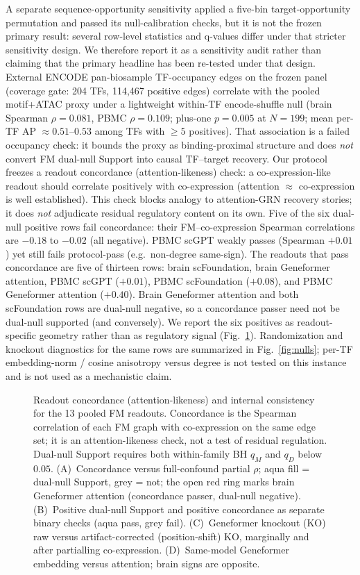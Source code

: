 \documentclass[fleqn,10pt,lineno]{wlpeerj}
\newcommand{\fitfig}[1]{\resizebox{\ifdim\width>\linewidth\linewidth\else\width\fi}{!}{#1}}
\begin{document}
A separate sequence-opportunity sensitivity applied a five-bin target-opportunity permutation and
passed its null-calibration checks, but it is not the frozen primary result: several row-level
statistics and q-values differ under that stricter sensitivity design. We therefore report it as a
sensitivity audit rather than claiming that the primary headline has been re-tested under that
design.
External ENCODE pan-biosample TF-occupancy edges on the frozen panel (coverage gate:
204 TFs, 114{,}467 positive edges) correlate with the pooled motif+ATAC proxy under a lightweight
within-TF encode-shuffle null (brain Spearman $\rho=0.081$, PBMC $\rho=0.109$; plus-one
$p=0.005$ at $N=199$; mean per-TF AP $\approx0.51$--$0.53$ among TFs with $\ge5$ positives).
That association is a failed occupancy check: it bounds the proxy as
binding-proximal structure and does \emph{not} convert FM dual-null Support into causal TF--target
recovery.
 Our protocol freezes a readout
concordance (attention-likeness) check: a co-expression-like readout should correlate
positively with co-expression (attention $\approx$ co-expression is well established). This check
blocks analogy to attention-GRN recovery stories; it does \emph{not} adjudicate residual regulatory
content on its own. Five of the six dual-null positive rows fail concordance: their FM--co-expression
Spearman correlations are $-0.18$ to $-0.02$ (all negative). PBMC scGPT weakly passes
(Spearman $+0.01$) yet still fails protocol-pass (e.g.\ non-degree same-sign). The readouts that
pass concordance are five of thirteen rows: brain scFoundation, brain Geneformer attention,
PBMC scGPT ($+0.01$), PBMC scFoundation ($+0.08$), and PBMC Geneformer attention ($+0.40$).
Brain Geneformer attention and both scFoundation rows are dual-null negative, so a concordance
passer need not be dual-null supported (and conversely).
We report the six positives as readout-specific geometry rather than as regulatory signal
(Fig.~\ref{fig:concordance}). Randomization and knockout diagnostics for the same rows are
summarized in Fig.~\ref{fig:nulls}; per-TF embedding-norm / cosine anisotropy versus degree is
not tested on this instance and is not used as a mechanistic claim.

\begin{figure}[!tbp]\centering
\fitfig{}
\caption{Readout concordance (attention-likeness) and internal consistency for the 13 pooled FM
readouts. Concordance is the Spearman correlation of each FM graph with co-expression on the same
edge set; it is an attention-likeness check, not a test of residual regulation. Dual-null Support
requires both within-family BH $q_M$ and $q_D$ below $0.05$. (A)~Concordance versus full-confound
partial $\rho$; aqua fill = dual-null Support, grey = not; the open red ring marks brain Geneformer
attention (concordance passer, dual-null negative). (B)~Positive dual-null Support and positive
concordance as separate binary checks (aqua pass, grey fail). (C)~Geneformer knockout (KO) raw
versus artifact-corrected (position-shift) KO, marginally and after partialling co-expression.
(D)~Same-model Geneformer embedding versus attention; brain signs are opposite.}
\label{fig:concordance}
\end{figure}
\end{document}
